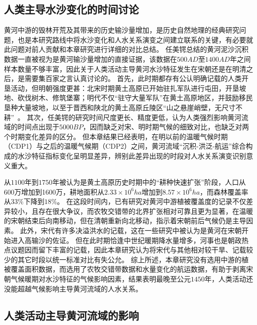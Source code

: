\subsection{人类主导水沙变化的时间讨论}

黄河中游的毁林开荒及其带来的历史输沙量增加，是历史自然地理的经典研究问题，也是本研究路线中将水沙变化和人水关系演变之间建立联系的关键，有必要就此问题对前人贡献和本章研究进行详细的对比总结。
任美锷总结的黄河泥沙沉积数据一直被视为是黄河输沙量增加的直接证据\cite{renmeie2006}，该数据在$500AD$至$1400AD$年之间样本数量不够丰富，因此关于人类活动主导黄河水沙特征发生在宋朝还是在明清之后，是需要集百家之言认真讨论的。
首先，此时期都存有公认明确记载的人类开垦活动，但明朝强度更甚：北宋时期黄土高原已开始驻扎军队进行屯田，开垦坡地、砍伐树木、修筑堡寨；明代不仅“驻守大量军队”在黄土高原地区，并鼓励移民垦种大量坡地，以至于晋西和陕北的黄土高原丘陵区“山之悬崖峭壁，无尺寸不耕”~\cite{renmeie2006,wu2020a,shinianhai1985}。
其次，任美锷的研究时间尺度更长、精度更低，认为人类强烈影响黄河流域的时间点出现于$5000BP$，因而缺乏对宋、明时期气候的细致对比，也缺乏对两个时期变化差异的区分\cite{renmeie2006, mei-e1994}。
但本章结果已经表明，在明以前的温暖气候时期（CDP1）与之后的温暖气候期（CDP2）之间，黄河流域“沉积-洪泛-航运”综合构成的水沙特征指标变化呈明显差异，辨别此差异出现的时段对人水关系演变识别意义重大。

从$1100$年到$1750$年被认为是黄土高原历史时期中的“耕种快速扩张”阶段，人口从600万增加到1600万，耕地面积从$2.33 \times 10^6 ha$增加到$8.57 \times 10^6 ha$，而森林覆盖率从$33\%$下降到$18\%$\cite{wu2020a}。
在这段时间内，已有研究对黄河中游植被覆盖度的记录不仅差异较小，且存在很大争议，而农牧交错带的北界扩张相对可靠且更为显著，在温暖的宋朝结束后向南移动，但在清朝重新向北移动，指示着宋朝前后气候仍是主导因素\cite{shinianhai1985,GeQuanSheng2011}。
此外，宋代有许多决溢洪水的记载，这在一些研究中被认为是黄河在宋朝开始进入高输沙的佐证\cite{chen2012}。
但在此时期恰逢中世纪暖期降水量增多，河事也是朝政热点议题因而留下丰富的记载，因此本章研究认为将宋代与其他相对较干旱、记载较少的其它时段以统一标准对比有失公允。
综上所述，本章研究没有选用中游的植被覆盖面积数据，而选用了农牧交错带数据和水量变化的航运数据，有助于剥离宋朝气候暖期对水沙特征的气候影响因素，结果表明最晚至公元$1450$年，人类活动还没能超越气候影响主导黄河流域的人水关系。

\subsection{人类活动主导黄河流域的影响}\label{ch3:sec:human-activity}

